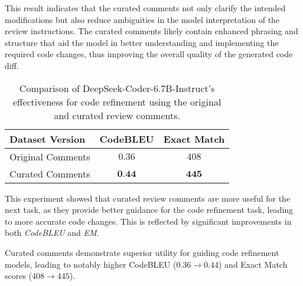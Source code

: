 This result indicates that the curated comments not only clarify the intended modifications but also reduce ambiguities in the model interpretation of the review instructions. The curated comments likely contain enhanced phrasing and structure that aid the model in better understanding and implementing the required code changes, thus improving the overall quality of the generated code diff.

\begin{table}[h!]
\centering
\caption{Comparison of DeepSeek-Coder-6.7B-Instruct's effectiveness for code refinement using the original and curated review comments.}
\label{tab:ref_results}
\begin{tabular}{@{}lcc@{}}
\toprule
\textbf{Dataset Version}       & \textbf{CodeBLEU} & \textbf{Exact Match} \\ \midrule
Original Comments & $0.36$ & $408$\\
Curated Comments  & $\textbf{0.44}$ & $\textbf{445}$\\ 
\bottomrule
\end{tabular}
\vspace{-.5em}
\end{table}



This experiment showed that curated review comments are more useful for the next task, as they provide better guidance for the code refinement task, leading to more accurate code changes. This is reflected by significant improvements in both \emph{CodeBLEU} and \emph{EM}.




\begin{center}
\begin{tcolorbox}[colframe=black!75!black, colback=black!5!white, title=\textbf{Answer to RQ4}]
    Curated comments demonstrate superior utility for guiding code refinement models, leading to notably higher CodeBLEU ($0.36 \rightarrow 0.44$) and Exact Match scores ($408 \rightarrow 445$).
\end{tcolorbox}
\end{center}








